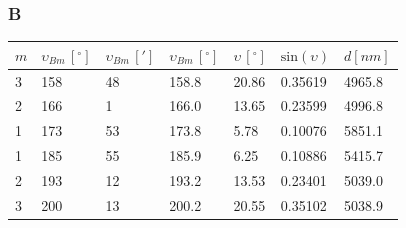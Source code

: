 \documentclass[a4paper, 11pt]{article}
\begin{document}
\subsubsection{B}\label{sec:b} %
\begin{center}
	\begin{tabular}{|l|l|l|l|l|l|l|}
		\hline
		$m $ & $\upsilon_{Bm} \, [^{\circ}]$ & $\upsilon_{Bm} \, [']$ & $\upsilon_{Bm} \, [^{\circ}]$ & $\upsilon \, [^{\circ}]$ & $\text{sin}(\upsilon)$ & $d [nm]$ \\ \hline
		3    & 158                           & 48                     & 158.8                         & 20.86                    & 0.35619                & 4965.8   \\ \hline
		2    & 166                           & 1                      & 166.0                         & 13.65                    & 0.23599                & 4996.8   \\ \hline
		1    & 173                           & 53                     & 173.8                         & 5.78                     & 0.10076                & 5851.1   \\ \hline
		1    & 185                           & 55                     & 185.9                         & 6.25                     & 0.10886                & 5415.7   \\ \hline
		2    & 193                           & 12                     & 193.2                         & 13.53                    & 0.23401                & 5039.0   \\ \hline
		3    & 200                           & 13                     & 200.2                         & 20.55                    & 0.35102                & 5038.9   \\ \hline
	\end{tabular}
\end{center}
\end{document}
